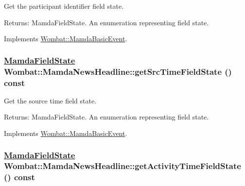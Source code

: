 Get the participant identifier field state. 

\begin{Desc}
\item[Returns:]Mamda\-Field\-State. An enumeration representing field state. \end{Desc}


Implements \hyperlink{classWombat_1_1MamdaBasicEvent_c361c99af2cf7eb9f5621d89f744fc62}{Wombat::Mamda\-Basic\-Event}.\hypertarget{classWombat_1_1MamdaNewsHeadline_dcc694fb0275a765150b900a12e0eb83}{
\subsubsection[getSrcTimeFieldState]{\setlength{\rightskip}{0pt plus 5cm}\hyperlink{namespaceWombat_93aac974f2ab713554fd12a1fa3b7d2a}{Mamda\-Field\-State} Wombat::Mamda\-News\-Headline::get\-Src\-Time\-Field\-State () const}}
\label{classWombat_1_1MamdaNewsHeadline_dcc694fb0275a765150b900a12e0eb83}


Get the source time field state. 

\begin{Desc}
\item[Returns:]Mamda\-Field\-State. An enumeration representing field state. \end{Desc}


Implements \hyperlink{classWombat_1_1MamdaBasicEvent_9cd58f3d7b5ebea42fa86e5dde46ab18}{Wombat::Mamda\-Basic\-Event}.\hypertarget{classWombat_1_1MamdaNewsHeadline_87fdd5a28a8eb589ea70b255455df57f}{
\subsubsection[getActivityTimeFieldState]{\setlength{\rightskip}{0pt plus 5cm}\hyperlink{namespaceWombat_93aac974f2ab713554fd12a1fa3b7d2a}{Mamda\-Field\-State} Wombat::Mamda\-News\-Headline::get\-Activity\-Time\-Field\-State () const}}
\label{classWombat_1_1MamdaNewsHeadline_87fdd5a28a8eb589ea70b255455df57f}


